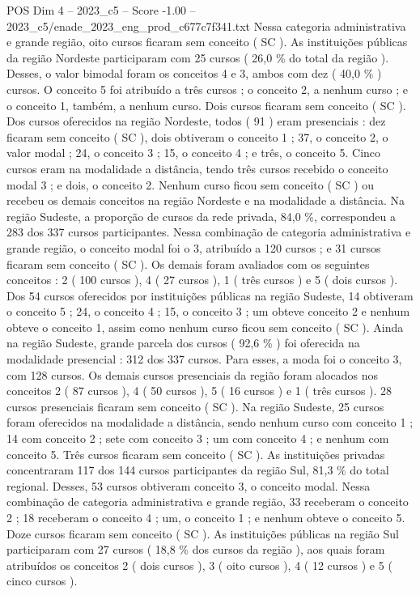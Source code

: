 \begin{textsample}{POS Dim 4 – 2023\_c5 – Score -1.00 – 2023\_c5/enade\_2023\_eng\_prod\_c677c7f341.txt}
Nessa categoria administrativa e grande região, oito cursos ficaram sem conceito ( SC ).
As instituições públicas da região Nordeste participaram com 25 cursos ( 26,0 \% do total da região ).
Desses, o valor bimodal foram os conceitos 4 e 3, ambos com dez ( 40,0 \% ) cursos.
O conceito 5 foi atribuído a três cursos ; o conceito 2, a nenhum curso ; e o conceito 1, também, a nenhum curso.
Dois cursos ficaram sem conceito ( SC ).
Dos cursos oferecidos na região Nordeste, todos ( 91 ) eram presenciais : dez ficaram sem conceito ( SC ), dois obtiveram o conceito 1 ; 37, o conceito 2, o valor modal ; 24, o conceito 3 ; 15, o conceito 4 ; e três, o conceito 5.
Cinco cursos eram na modalidade a distância, tendo três cursos recebido o conceito modal 3 ; e dois, o conceito 2.
Nenhum curso ficou sem conceito ( SC ) ou recebeu os demais conceitos na região Nordeste e na modalidade a distância.
Na região Sudeste, a proporção de cursos da rede privada, 84,0 \%, correspondeu a 283 dos 337 cursos participantes.
Nessa combinação de categoria administrativa e grande região, o conceito modal foi o 3, atribuído a 120 cursos ; e 31 cursos ficaram sem conceito ( SC ).
Os demais foram avaliados com os seguintes conceitos : 2 ( 100 cursos ), 4 ( 27 cursos ), 1 ( três cursos ) e 5 ( dois cursos ).
Dos 54 cursos oferecidos por instituições públicas na região Sudeste, 14 obtiveram o conceito 5 ; 24, o conceito 4 ; 15, o conceito 3 ; um obteve conceito 2 e nenhum obteve o conceito 1, assim como nenhum curso ficou sem conceito ( SC ).
Ainda na região Sudeste, grande parcela dos cursos ( 92,6 \% ) foi oferecida na modalidade presencial : 312 dos 337 cursos.
Para esses, a moda foi o conceito 3, com 128 cursos.
Os demais cursos presenciais da região foram alocados nos conceitos 2 ( 87 cursos ), 4 ( 50 cursos ), 5 ( 16 cursos ) e 1 ( três cursos ). 28 cursos presenciais ficaram sem conceito ( SC ).
Na região Sudeste, 25 cursos foram oferecidos na modalidade a distância, sendo nenhum curso com conceito 1 ; 14 com conceito 2 ; sete com conceito 3 ; um com conceito 4 ; e nenhum com conceito 5.
Três cursos ficaram sem conceito ( SC ).
As instituições privadas concentraram 117 dos 144 cursos participantes da região Sul, 81,3 \% do total regional.
Desses, 53 cursos obtiveram conceito 3, o conceito modal.
Nessa combinação de categoria administrativa e grande região, 33 receberam o conceito 2 ; 18 receberam o conceito 4 ; um, o conceito 1 ; e nenhum obteve o conceito 5.
Doze cursos ficaram sem conceito ( SC ).
As instituições públicas na região Sul participaram com 27 cursos ( 18,8 \% dos cursos da região ), aos quais foram atribuídos os conceitos 2 ( dois cursos ), 3 ( oito cursos ), 4 ( 12 cursos ) e 5 ( cinco cursos ).

\end{textsample}
